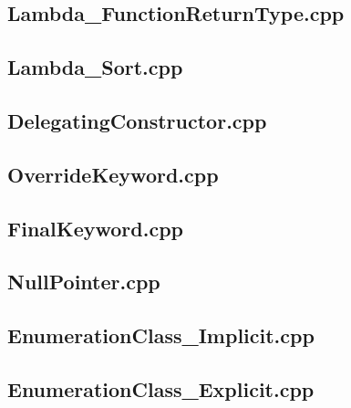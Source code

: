 \documentclass[11pt]{report}
\begin{document}
\begin{appendix}
\subsection{Lambda\_FunctionReturnType.cpp}
\label{Lambda_FunctionReturnType}


\subsection{Lambda\_Sort.cpp}
\label{Lambda_Sort}


\subsection{DelegatingConstructor.cpp}
\label{DelegatingConstructor}


\subsection{OverrideKeyword.cpp}
\label{OverrideKeyword}


\subsection{FinalKeyword.cpp}
\label{FinalKeyword}


\subsection{NullPointer.cpp}
\label{NullPointer}


\subsection{EnumerationClass\_Implicit.cpp}
\label{EnumerationClass_Implicit}


\subsection{EnumerationClass\_Explicit.cpp}
\label{EnumerationClass_Explicit}



\end{appendix}
\end{document}

